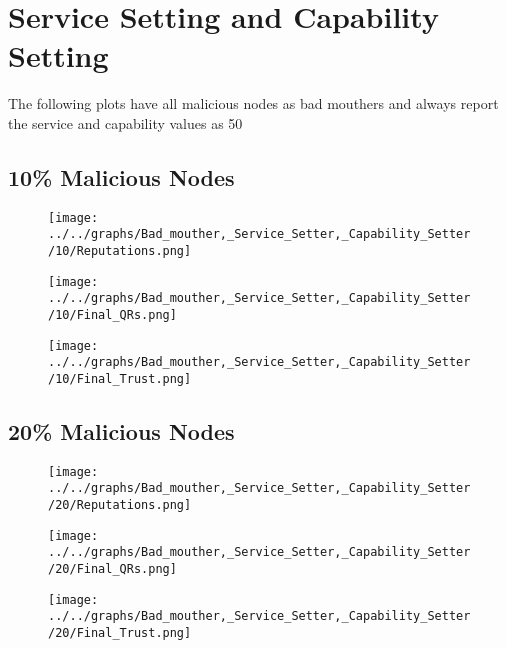 \section*{Service Setting and Capability Setting}
The following plots have all malicious nodes as bad mouthers and always
report the service and capability values as 50
\\
\begin{minipage}[t]{0.49\columnwidth}
\subsection*{10\% Malicious Nodes}
    \begin{figure}[H]
        \centering
        \texttt{[image: ../../graphs/Bad\_mouther,\_Service\_Setter,\_Capability\_Setter/10/Reputations.png]}
    \end{figure}
    \begin{figure}[H]
        \centering
        \texttt{[image: ../../graphs/Bad\_mouther,\_Service\_Setter,\_Capability\_Setter/10/Final\_QRs.png]}
    \end{figure}
\end{minipage}
\begin{minipage}[t]{0.49\columnwidth}
    \begin{figure}[H]
        \centering
        \texttt{[image: ../../graphs/Bad\_mouther,\_Service\_Setter,\_Capability\_Setter/10/Final\_Trust.png]}
    \end{figure}
\end{minipage}

\begin{minipage}[t]{0.49\columnwidth}
\subsection*{20\% Malicious Nodes}
    \begin{figure}[H]
        \centering
        \texttt{[image: ../../graphs/Bad\_mouther,\_Service\_Setter,\_Capability\_Setter/20/Reputations.png]}
    \end{figure}
    \begin{figure}[H]
        \centering
        \texttt{[image: ../../graphs/Bad\_mouther,\_Service\_Setter,\_Capability\_Setter/20/Final\_QRs.png]}
    \end{figure}
\end{minipage}
\begin{minipage}[t]{0.49\columnwidth}
    \begin{figure}[H]
        \centering
        \texttt{[image: ../../graphs/Bad\_mouther,\_Service\_Setter,\_Capability\_Setter/20/Final\_Trust.png]}
    \end{figure}
\end{minipage}

